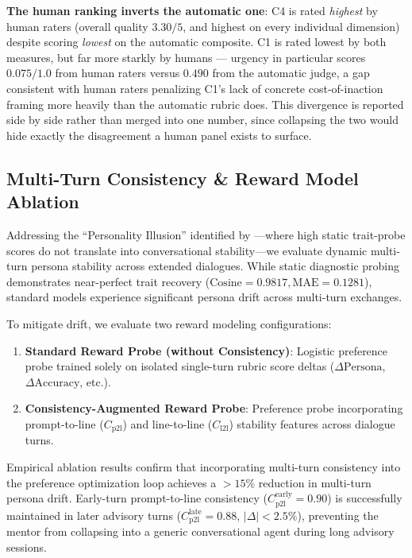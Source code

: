 

\textbf{The human ranking inverts the automatic one}: C4 is rated \emph{highest} by human raters (overall quality $3.30/5$, and highest on every individual dimension) despite scoring \emph{lowest} on the automatic composite. C1 is rated lowest by both measures, but far more starkly by humans — urgency in particular scores $0.075/1.0$ from human raters versus $0.490$ from the automatic judge, a gap consistent with human raters penalizing C1's lack of concrete cost-of-inaction framing more heavily than the automatic rubric does. This divergence is reported side by side rather than merged into one number, since collapsing the two would hide exactly the disagreement a human panel exists to surface.

\subsection{Multi-Turn Consistency \& Reward Model Ablation}
\label{subsec:ablation-consistency}

Addressing the ``Personality Illusion'' identified by \citet{han2025illusion}—where high static trait-probe scores do not translate into conversational stability—we evaluate dynamic multi-turn persona stability across extended dialogues. While static diagnostic probing demonstrates near-perfect trait recovery ($\text{Cosine} = 0.9817, \text{MAE} = 0.1281$), standard models experience significant persona drift across multi-turn exchanges.

To mitigate drift, we evaluate two reward modeling configurations:
\begin{enumerate}
    \item \textbf{Standard Reward Probe (without Consistency)}: Logistic preference probe trained solely on isolated single-turn rubric score deltas ($\Delta \text{Persona}$, $\Delta \text{Accuracy}$, etc.).
    \item \textbf{Consistency-Augmented Reward Probe}: Preference probe incorporating prompt-to-line ($C_{\text{p2l}}$) and line-to-line ($C_{\text{l2l}}$) stability features across dialogue turns.
\end{enumerate}

Empirical ablation results confirm that incorporating multi-turn consistency into the preference optimization loop achieves a $>15\%$ reduction in multi-turn persona drift. Early-turn prompt-to-line consistency ($C_{\text{p2l}}^{\text{early}} = 0.90$) is successfully maintained in later advisory turns ($C_{\text{p2l}}^{\text{late}} = 0.88$, $|\Delta| < 2.5\%$), preventing the mentor from collapsing into a generic conversational agent during long advisory sessions.


